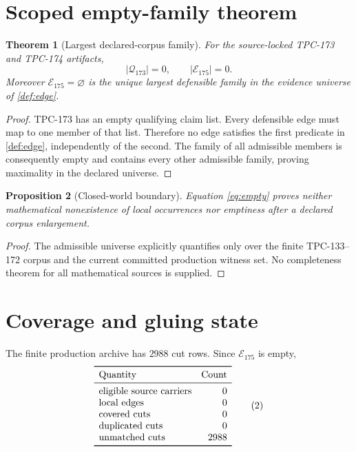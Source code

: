 \documentclass[11pt]{article}
\newtheorem{theorem}{Theorem}[section]
\newtheorem{proposition}[theorem]{Proposition}
\begin{document}
\section{Scoped empty-family theorem}

\begin{theorem}[Largest declared-corpus family]\label{thm:empty}
For the source-locked TPC-173 and TPC-174 artifacts,
\[
 |\mathcal Q_{173}|=0,\qquad
 |\mathcal E_{175}|=0.
\tag{1}\label{eq:empty}
\]
Moreover \(\mathcal E_{175}=\varnothing\) is the unique largest defensible
family in the evidence universe of \cref{def:edge}.
\end{theorem}

\begin{proof}
TPC-173 has an empty qualifying claim list.  Every defensible edge must map
to one member of that list.  Therefore no edge satisfies the first
predicate in \cref{def:edge}, independently of the second.  The family of
all admissible members is consequently empty and contains every other
admissible family, proving maximality in the declared universe.
\end{proof}

\begin{proposition}[Closed-world boundary]\label{prop:boundary}
Equation \eqref{eq:empty} proves neither mathematical nonexistence of local
occurrences nor emptiness after a declared corpus enlargement.
\end{proposition}

\begin{proof}
The admissible universe explicitly quantifies only over the finite
TPC-133--172 corpus and the current committed production witness set.  No
completeness theorem for all mathematical sources is supplied.
\end{proof}

\section{Coverage and gluing state}

The finite production archive has \(2988\) cut rows.  Since
\(\mathcal E_{175}\) is empty,
\[
\begin{array}{lr}
\toprule
\text{Quantity}&\text{Count}\\
\midrule
\text{eligible source carriers}&0\\
\text{local edges}&0\\
\text{covered cuts}&0\\
\text{duplicated cuts}&0\\
\text{unmatched cuts}&2988\\
\bottomrule
\end{array}
\tag{2}\label{eq:coverage}
\]
\end{document}
